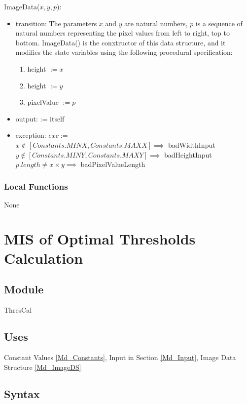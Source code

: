 \documentclass[12pt, titlepage]{article}
\begin{document}
\noindent ImageData($x, y, p$):
\begin{itemize}
\item transition: 
The parameters $x$ and $y$ are natural numbers, $p$ is a sequence of natural
numbers representing the pixel values from left to right, top to bottom.
ImageData() is the conxtructor of this data structure, and it modifies
the state variables using the following procedural specification:
\begin{enumerate}
    \item
    height $:= x$
    \item
    height $:= y$
    \item
    pixelValue $:= p$
\end{enumerate}
\item output: := itself
\item exception: $exc :=$\\
$x \not\in [Constants.MINX,Constants.MAXX] \implies$ badWidthInput\\
$y \not\in [Constants.MINY,Constants.MAXY] \implies$ badHeightInput\\
$p.length \not= x \times y \implies$ badPixelValueLength
\end{itemize}

\subsubsection{Local Functions}
None

\newpage

\section{MIS of Optimal Thresholds Calculation} \label{Md_Calculation}

\subsection{Module}

ThresCal

\subsection{Uses}

Constant Values \ref{Md_Constants}, Input in Section \ref{Md_Input}, Image Data
Structure \ref{Md_ImageDS}

\subsection{Syntax}
\end{document}
